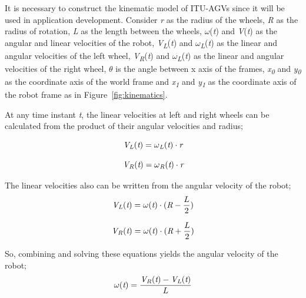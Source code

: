 It is necessary to construct the kinematic model of ITU-AGVs since it will be used in application development. Consider \textit{r} as the radius of the wheels, \textit{R} as the radius of rotation, \textit{L} as the length between the wheels, $\omega$(\textit{t}) and \textit{V}(\textit{t}) as the angular and linear velocities of the robot, \textit{V\textsubscript{L}}(\textit{t}) and $\omega$\textit{\textsubscript{L}}(\textit{t}) as the linear and angular velocities of the left wheel, \textit{V\textsubscript{R}}(\textit{t}) and $\omega$\textit{\textsubscript{L}}(\textit{t}) as the linear and angular velocities of the right wheel, $\theta$ is the angle between x axis of the frames, \textit{x\textsubscript{0}} and \textit{y\textsubscript{0}} as the coordinate axis of the world frame and \textit{x\textsubscript{1}} and \textit{y\textsubscript{1}} as the coordinate axis of the robot frame as in Figure~\ref{fig:kinematics}. 
\par
At any time instant \textit{t}, the linear velocities at left and right wheels can be calculated from the product of their angular velocities and radius;
\par 
\begin{equation}
\textit{V\textsubscript{L}}(\textit{t}) = \omega\textit{\textsubscript{L}}(\textit{t})\cdot\textit{r}
\end{equation}

\begin{equation}
\textit{V\textsubscript{R}}(\textit{t}) = \omega\textit{\textsubscript{R}}(\textit{t})\cdot\textit{r}
\end{equation}

The linear velocities also can be written from the angular velocity of the robot;
\begin{equation}
\textit{V\textsubscript{L}}(\textit{t}) = \omega(\textit{t})\cdot(\textit{R}-\frac{L}{2})
\end{equation}

\begin{equation}
\textit{V\textsubscript{R}}(\textit{t}) = \omega(\textit{t})\cdot(\textit{R}+\frac{L}{2})
\end{equation}

So, combining and solving these equations yields the angular velocity of the robot;
\begin{equation}
\omega(\textit{t}) = \frac{\textit{V\textsubscript{R}}(\textit{t})-\textit{V\textsubscript{L}}(\textit{t})}{L}
\end{equation}

